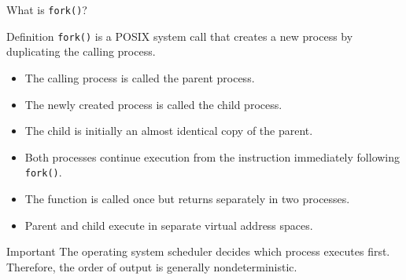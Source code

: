 \documentclass[aspectratio=169]{beamer}
\begin{document}
\begin{frame}{What is \texttt{fork()}?}

\begin{block}{Definition}
\texttt{fork()} is a POSIX system call that creates a new process by duplicating
the calling process.
\end{block}

\begin{itemize}
    \item The calling process is called the parent process.
    \item The newly created process is called the child process.
    \item The child is initially an almost identical copy of the parent.
    \item Both processes continue execution from the instruction immediately
    following \texttt{fork()}.
    \item The function is called once but returns separately in two processes.
    \item Parent and child execute in separate virtual address spaces.
\end{itemize}

\begin{alertblock}{Important}
The operating system scheduler decides which process executes first. Therefore,
the order of output is generally nondeterministic.
\end{alertblock}

\end{frame}
\end{document}
